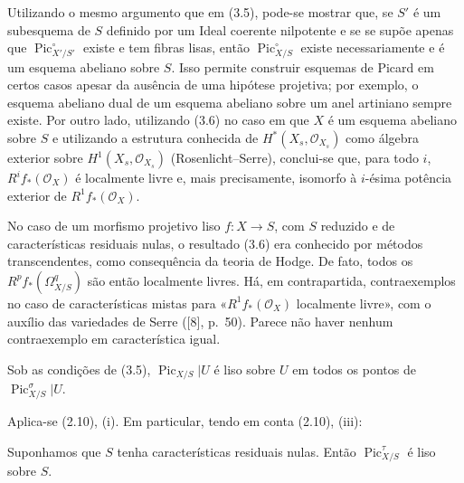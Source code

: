  Utilizando o mesmo argumento que em (3.5), pode-se
mostrar que, se $S'$ é um subesquema de $S$ definido por um Ideal coerente
nilpotente e se se supõe apenas que $\operatorname{Pic}_{X'/S'}^\circ$ existe e
tem fibras lisas, então $\operatorname{Pic}_{X/S}^\circ$ existe
necessariamente e é um esquema abeliano sobre $S$. Isso permite construir
esquemas de Picard em certos casos apesar da ausência de uma hipótese
projetiva; por exemplo, o esquema abeliano dual de um esquema abeliano sobre um
anel artiniano sempre existe. Por outro lado, utilizando (3.6) no caso em que
$X$ é um esquema abeliano sobre $S$ e utilizando a estrutura conhecida de
$H^*(X_s,\mathcal O_{X_s})$ como álgebra exterior sobre
$H^1(X_s,\mathcal O_{X_s})$ (Rosenlicht--Serre), conclui-se que, para todo
$i$, $R^if_*(\mathcal O_X)$ é localmente livre e, mais precisamente, isomorfo
à $i$-ésima potência exterior de $R^1f_*(\mathcal O_X)$.

 No caso de um morfismo projetivo liso
$f:X\longrightarrow S$, com $S$ reduzido e de características residuais
nulas, o resultado (3.6) era conhecido por métodos transcendentes, como
consequência da teoria de Hodge. De fato, todos os
$R^pf_*(\Omega^q_{X/S})$ são então localmente livres. Há, em contrapartida,
contraexemplos
no caso de características mistas para «$R^1f_*(\mathcal O_X)$ localmente
livre», com o auxílio das variedades de Serre ([8], p.~50). Parece não haver
nenhum contraexemplo em característica igual.

 Sob as condições de (3.5),
$\operatorname{Pic}_{X/S}|U$ é liso sobre $U$ em todos os pontos de
$\operatorname{Pic}_{X/S}^\sigma|U$.

Aplica-se (2.10), (i). Em particular, tendo em conta (2.10), (iii):

 Suponhamos que $S$ tenha características residuais
nulas. Então $\operatorname{Pic}_{X/S}^\tau$ é liso sobre $S$.

